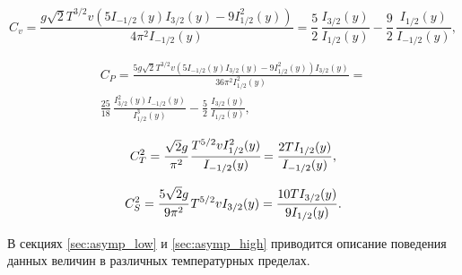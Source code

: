 \begin{equation}
   \label{eq:C_v}
   C_v = \frac{g\sqrt{2} T^{3 /2} v \left( 5 I_{-1 / 2 } (y) I_{3 /2} (y) - 9 I_{1 / 2}^2 (y)\right)}{4\pi^2 I_{-1 / 2} (y)}
   = \frac{5}{2}\,\frac{I_{3/2}(y)}{I_{1/2}(y)} - \frac{9}{2}\,\frac{I_{1/2}(y)}{I_{-1/2}(y)},
\end{equation}

\begin{multline}
   \label{eq:C_P}
      C_{P} = \frac{5 g \sqrt{2} T^{3 / 2} v\left(5 I_{-1 / 2}(y) I_{3 / 2}(y)-9 I_{1 / 2}^{2}(y)\right) I_{3 / 2}(y)}{36 \pi^{2} I_{1 / 2}^{2}(y)}
      = {}\\
      \frac{25}{18}\,\frac{I^2_{3/2}(y)I_{-1/2}(y)}{I^3_{1/2}(y)} - \frac{5}{2}\,\frac{I_{3/2}(y)}{I_{1/2}(y)},
\end{multline}

\begin{equation}
   \label{eq:C_T}
   C_{T}^2 = \cfrac{\sqrt{2}g}{\pi^2}\,  \cfrac{T^{5 /2} v I_{1 / 2}^2 (y)}{I_{-1 / 2} (y)}
   = \frac{2TI_{1/2}(y)}{I_{-1/2}(y)},
\end{equation}

\begin{equation}
   \label{eq:C_S}
   C_{S}^2 = \cfrac{5 \sqrt{2}g}{9 \pi^2}\, T^{5 / 2} v I_{3 / 2} (y)
   = \frac{10T I_{3/2}(y)}{9I_{1/2}(y)}.
\end{equation}

В секциях \ref{sec:asymp_low} и \ref{sec:asymp_high} приводится описание поведения данных величин в различных температурных пределах.

